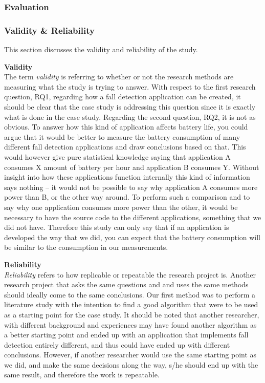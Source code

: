 \documentclass[12pt, a4paper, onecolumn]{article}
\newcommand{\parag}[1]{
	\textbf{#1} \hspace{0pt} \\
}
\begin{document}
	\subsubsection{Evaluation}
	
	\subsubsection{Validity \& Reliability}
	
	This section discusses the validity and reliability of the study.
	
	\parag{Validity}
	The term \textit{validity} is referring to whether or not the research methods are measuring what the study is trying to answer. With respect to the first research question, RQ1, regarding how a fall detection application can be created, it should be clear that the case study is addressing this question since it is exactly what is done in the case study. Regarding the second question, RQ2, it is not as obvious. To answer how this kind of application affects battery life, you could argue that it would be better to measure the battery consumption of many different fall detection applications and draw conclusions based on that. This would however give pure statistical knowledge saying that application A consumes X amount of battery per hour and application B consumes Y. Without insight into how these applications function internally this kind of information says nothing -- it would not be possible to say why application A consumes more power than B, or the other way around. To perform such a comparison and to say why one application consumes more power than the other, it would be necessary to have the source code to the different applications, something that we did not have. Therefore this study can only say that if an application is developed the way that we did, you can expect that the battery consumption will be similar to the consumption in our measurements.
	
	\parag{Reliability}
	\textit{Reliability} refers to how replicable or repeatable the research project is. Another research project that asks the same questions and and uses the same methods should ideally come to the same conclusions. Our first method was to perform a literature study with the intention to find a good algorithm that were to be used as a starting point for the case study. It should be noted that another researcher, with different background and experiences may have found another algorithm as a better starting point and ended up with an application that implements fall detection entirely different, and thus could have ended up with different conclusions. However, if another researcher would use the same starting point as we did, and make the same decisions along the way, s/he should end up with the same result, and therefore the work is repeatable.
	
\end{document}
